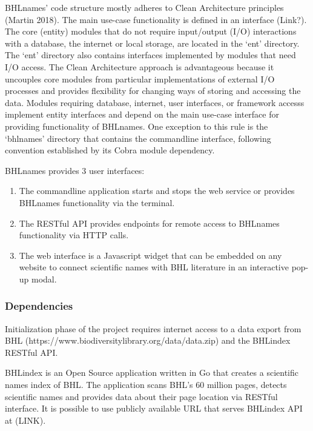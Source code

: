\documentclass[
]{article}
\begin{document}
BHLnames' code structure mostly adheres to Clean Architecture principles
(Martin 2018). The main use-case functionality is defined in an
interface (Link?). The core (entity) modules that do not require
input/output (I/O) interactions with a database, the internet or local
storage, are located in the `ent' directory. The `ent' directory also
contains interfaces implemented by modules that need I/O access. The
Clean Architecture approach is advantageous because it uncouples core
modules from particular implementations of external I/O processes and
provides flexibility for changing ways of storing and accessing the
data. Modules requiring database, internet, user interfaces, or
framework accesss implement entity interfaces and depend on the main
use-case interface for providing functionality of BHLnames. One
exception to this rule is the `bhlnames' directory that contains the
commandline interface, following convention established by its Cobra
module dependency.

BHLnames provides 3 user interfaces:

\begin{enumerate}
\def\labelenumi{\arabic{enumi}.}
\item
  The commandline application starts and stops the web service or
  provides BHLnames functionality via the terminal.
\item
  The RESTful API provides endpoints for remote access to BHLnames
  functionality via HTTP calls.
\item
  The web interface is a Javascript widget that can be embedded on any
  website to connect scientific names with BHL literature in an
  interactive pop-up modal.
\end{enumerate}

\hypertarget{dependencies}{%
\subsubsection{Dependencies}\label{dependencies}}

Initialization phase of the project requires internet access to a data
export from BHL (https://www.biodiversitylibrary.org/data/data.zip) and
the BHLindex RESTful API.

BHLindex is an Open Source application written in Go that creates a
scientific names index of BHL. The application scans BHL's 60 million
pages, detects scientific names and provides data about their page
location via RESTful interface. It is possible to use publicly available
URL that serves BHLindex API at (LINK).
\end{document}
